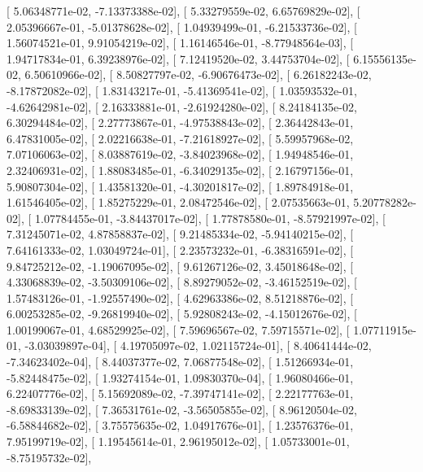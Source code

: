 \documentclass{article}
\begin{document}
       [  5.06348771e-02,  -7.13373388e-02],
       [  5.33279559e-02,   6.65769829e-02],
       [  2.05396667e-01,  -5.01378628e-02],
       [  1.04939499e-01,  -6.21533736e-02],
       [  1.56074521e-01,   9.91054219e-02],
       [  1.16146546e-01,  -8.77948564e-03],
       [  1.94717834e-01,   6.39238976e-02],
       [  7.12419520e-02,   3.44753704e-02],
       [  6.15556135e-02,   6.50610966e-02],
       [  8.50827797e-02,  -6.90676473e-02],
       [  6.26182243e-02,  -8.17872082e-02],
       [  1.83143217e-01,  -5.41369541e-02],
       [  1.03593532e-01,  -4.62642981e-02],
       [  2.16333881e-01,  -2.61924280e-02],
       [  8.24184135e-02,   6.30294484e-02],
       [  2.27773867e-01,  -4.97538843e-02],
       [  2.36442843e-01,   6.47831005e-02],
       [  2.02216638e-01,  -7.21618927e-02],
       [  5.59957968e-02,   7.07106063e-02],
       [  8.03887619e-02,  -3.84023968e-02],
       [  1.94948546e-01,   2.32406931e-02],
       [  1.88083485e-01,  -6.34029135e-02],
       [  2.16797156e-01,   5.90807304e-02],
       [  1.43581320e-01,  -4.30201817e-02],
       [  1.89784918e-01,   1.61546405e-02],
       [  1.85275229e-01,   2.08472546e-02],
       [  2.07535663e-01,   5.20778282e-02],
       [  1.07784455e-01,  -3.84437017e-02],
       [  1.77878580e-01,  -8.57921997e-02],
       [  7.31245071e-02,   4.87858837e-02],
       [  9.21485334e-02,  -5.94140215e-02],
       [  7.64161333e-02,   1.03049724e-01],
       [  2.23573232e-01,  -6.38316591e-02],
       [  9.84725212e-02,  -1.19067095e-02],
       [  9.61267126e-02,   3.45018648e-02],
       [  4.33068839e-02,  -3.50309106e-02],
       [  8.89279052e-02,  -3.46152519e-02],
       [  1.57483126e-01,  -1.92557490e-02],
       [  4.62963386e-02,   8.51218876e-02],
       [  6.00253285e-02,  -9.26819940e-02],
       [  5.92808243e-02,  -4.15012676e-02],
       [  1.00199067e-01,   4.68529925e-02],
       [  7.59696567e-02,   7.59715571e-02],
       [  1.07711915e-01,  -3.03039897e-04],
       [  4.19705097e-02,   1.02115724e-01],
       [  8.40641444e-02,  -7.34623402e-04],
       [  8.44037377e-02,   7.06877548e-02],
       [  1.51266934e-01,  -5.82448475e-02],
       [  1.93274154e-01,   1.09830370e-04],
       [  1.96080466e-01,   6.22407776e-02],
       [  5.15692089e-02,  -7.39747141e-02],
       [  2.22177763e-01,  -8.69833139e-02],
       [  7.36531761e-02,  -3.56505855e-02],
       [  8.96120504e-02,  -6.58844682e-02],
       [  3.75575635e-02,   1.04917676e-01],
       [  1.23576376e-01,   7.95199719e-02],
       [  1.19545614e-01,   2.96195012e-02],
       [  1.05733001e-01,  -8.75195732e-02],
\end{document}
